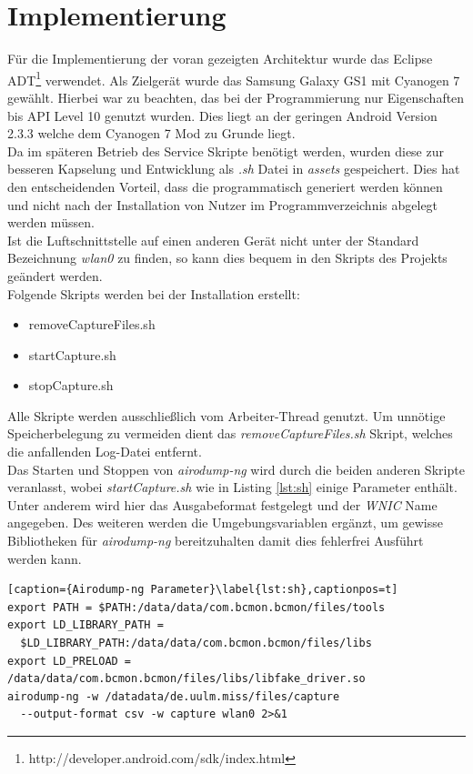 \documentclass[]{report}
\begin{document}
\section{Implementierung}
Für die Implementierung der voran gezeigten Architektur wurde das Eclipse ADT\footnote{http://developer.android.com/sdk/index.html} verwendet. Als Zielgerät wurde das Samsung Galaxy GS1 mit Cyanogen 7 gewählt. Hierbei war zu beachten, das bei der Programmierung nur Eigenschaften bis API Level 10 genutzt wurden. Dies liegt an der geringen Android Version 2.3.3 welche dem Cyanogen 7 Mod zu Grunde liegt. \\
Da im späteren Betrieb des Service Skripte benötigt werden, wurden diese zur besseren Kapselung und Entwicklung als \textit{.sh} Datei in \textit{assets} gespeichert. Dies hat den entscheidenden Vorteil, dass die programmatisch generiert werden können und nicht nach der Installation von Nutzer im Programmverzeichnis abgelegt werden müssen.\\ Ist die Luftschnittstelle auf einen anderen Gerät nicht unter der Standard Bezeichnung \textit{wlan0} zu finden, so kann dies bequem in den Skripts des Projekts geändert werden. \\ 
Folgende Skripts werden bei der Installation erstellt:
\begin{itemize}
\item removeCaptureFiles.sh
\item startCapture.sh
\item stopCapture.sh
\end{itemize}
Alle Skripte werden ausschließlich vom Arbeiter-Thread genutzt. Um unnötige Speicherbelegung zu vermeiden dient das \textit{removeCaptureFiles.sh} Skript, welches die anfallenden Log-Datei entfernt. \\ Das Starten und Stoppen von \textit{airodump-ng} wird durch die beiden anderen Skripte veranlasst, wobei \textit{startCapture.sh} wie in Listing \ref{lst:sh} einige Parameter enthält. Unter anderem wird hier das Ausgabeformat festgelegt und der \textit{WNIC} Name angegeben. Des weiteren werden die Umgebungsvariablen ergänzt, um gewisse Bibliotheken für \textit{airodump-ng} bereitzuhalten damit dies fehlerfrei Ausführt werden kann.
\begin{lstlisting}[caption={Airodump-ng Parameter}\label{lst:sh},captionpos=t] 
export PATH = $PATH:/data/data/com.bcmon.bcmon/files/tools
export LD_LIBRARY_PATH = 
  $LD_LIBRARY_PATH:/data/data/com.bcmon.bcmon/files/libs
export LD_PRELOAD = /data/data/com.bcmon.bcmon/files/libs/libfake_driver.so
airodump-ng -w /datadata/de.uulm.miss/files/capture 
  --output-format csv -w capture wlan0 2>&1
 \end{lstlisting}
\end{document}
